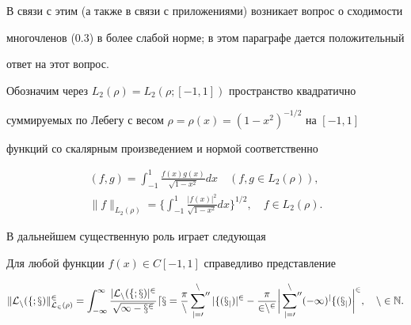 В связи с этим (а также в связи с приложениями) возникает вопрос о сходимости


многочленов (0.3) в более слабой норме; в этом параграфе дается положительный


ответ на этот вопрос.





Обозначим через $L_2(\rho)=L_2(\rho;[-1,1])$ пространство квадратично 


суммируемых по Лебегу с весом $\rho=\rho(x)=(1-x^2)^{-1/2}$ на $[-1,1]$


функций со скалярным произведением и нормой соответственно


\begin{gather*}


(f,g)=\int_{-1}^1 \frac{f(x)g(x)}{\sqrt{1-x^2}}dx\quad (f,g \in L_2(\rho)), \\


%


\|f\|_{L_2(\rho)}=\bigg\{\int_{-1}^1\frac{|f(x)|^2}


{\sqrt{1-x^2}}dx\bigg\}^{1/2},\quad f\in L_2(\rho).


\end{gather*}





В дальнейшем существенную роль играет следующая








\begin{lem}


Для любой функции $f(x)\in C[-1,1]$ справедливо представление


\begin{equation}


\|\cal{L}_n(f;x)\|^2_{L_2(\rho)}=


\int_{-1}^1\frac{|\cal{L}_n(f;x)|^2}{\sqrt{1-x^2}}dx=


\frac{\pi}{n}\sideset{}{''}\sum_{j=0}^n |f(x_j)|^2 -


\frac{\pi}{2n^2}\bigg|\sideset{}{''}\sum_{j=0}^n (-1)^jf(x_j)\bigg|^2,


\quad n\in \N.


\end{equation}


\end{lem}





